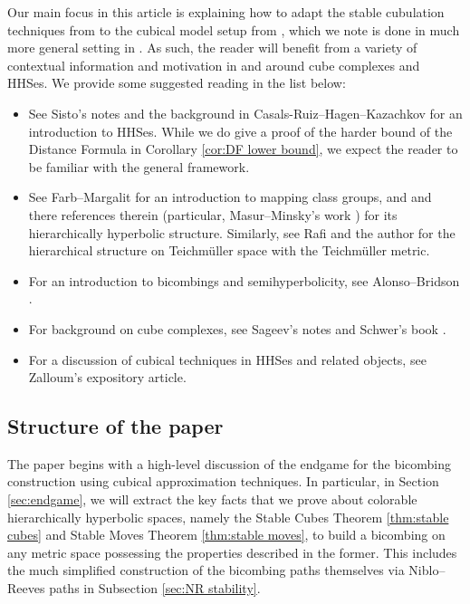 \documentclass{amsart}
\theoremstyle{definition}
\theoremstyle{remark}
\theoremstyle{definition}
\begin{document}
Our main focus in this article is explaining how to adapt the stable cubulation techniques from \cite{DMS_bary} to the  cubical model setup from \cite{Dur_infcube}, which we note is done in much more general setting in \cite{DMS_FJ}.  As such, the reader will benefit from a variety of contextual information and motivation in and around cube complexes and HHSes.  We provide some suggested reading in the list below:
\begin{itemize}
	\item  See Sisto's notes \cite{Sisto_HHS} and the background in Casals-Ruiz--Hagen--Kazachkov \cite{CRHK} for an introduction to HHSes.  While we do give a proof of the harder bound of the Distance Formula in Corollary \ref{cor:DF lower bound}, we expect the reader to be familiar with the general framework.
	\item  See Farb--Margalit \cite{FM_primer} for an introduction to mapping class groups, and \cite[Section 11]{HHS_II} and there references therein (particular, Masur--Minsky's work \cite{MM99, MM00}) for its hierarchically hyperbolic structure.  Similarly, see Rafi \cite{Rafi:combo, Rafi:hypteich} and the author \cite{Dur:augmented} for the hierarchical structure on Teichm\"uller space with the Teichm\"uller metric.
	\item For an introduction to bicombings and semihyperbolicity, see Alonso--Bridson \cite{AB95}.
	\item For background on cube complexes, see Sageev's notes \cite{Sageev:pcmi} and Schwer's book \cite{schwer2324cat}.
	\item  For a discussion of cubical techniques in HHSes and related objects, see Zalloum's expository article\cite{Zalloum_expo}.  
\end{itemize}

\subsection{Structure of the paper}

The paper begins with a high-level discussion of the endgame for the bicombing construction using cubical approximation techniques.  In particular, in Section \ref{sec:endgame}, we will extract the key facts that we prove about colorable hierarchically hyperbolic spaces, namely the Stable Cubes Theorem \ref{thm:stable cubes} and Stable Moves Theorem \ref{thm:stable moves}, to build a bicombing on any metric space possessing the properties described in the former.  This includes the much simplified construction of the bicombing paths themselves via Niblo--Reeves paths in Subsection \ref{sec:NR stability}.
\end{document}
